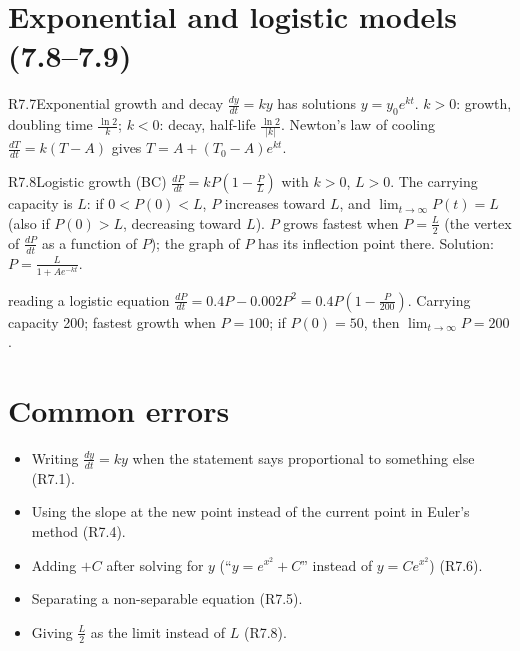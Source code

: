 \documentclass{apcalc}
\begin{document}
\section{Exponential and logistic models (7.8--7.9)}

\begin{rulebox}{R7.7}{Exponential growth and decay}
$\frac{dy}{dt}=ky$ has solutions $y=y_0e^{kt}$. $k>0$: growth, doubling time $\frac{\ln2}{k}$; $k<0$: decay, half-life $\frac{\ln2}{|k|}$. Newton's law of cooling $\frac{dT}{dt}=k(T-A)$ gives $T=A+(T_0-A)e^{kt}$.
\end{rulebox}

\begin{rulebox}{R7.8}{Logistic growth (BC)}
$\frac{dP}{dt}=kP\left(1-\frac PL\right)$ with $k>0$, $L>0$. The carrying capacity is $L$: if $0<P(0)<L$, $P$ increases toward $L$, and $\lim_{t\to\infty}P(t)=L$ (also if $P(0)>L$, decreasing toward $L$). $P$ grows fastest when $P=\frac L2$ (the vertex of $\frac{dP}{dt}$ as a function of $P$); the graph of $P$ has its inflection point there. Solution: $P=\frac{L}{1+Ae^{-kt}}$.
\end{rulebox}

\begin{example}{reading a logistic equation}
$\frac{dP}{dt}=0.4P-0.002P^2=0.4P\left(1-\frac{P}{200}\right)$. Carrying capacity 200; fastest growth when $P=100$; if $P(0)=50$, then $\lim_{t\to\infty}P=200$.
\end{example}

\section{Common errors}
\begin{itemize}
\item Writing $\frac{dy}{dt}=ky$ when the statement says proportional to something else (R7.1).
\item Using the slope at the new point instead of the current point in Euler's method (R7.4).
\item Adding $+C$ after solving for $y$ (``$y=e^{x^2}+C$'' instead of $y=Ce^{x^2}$) (R7.6).
\item Separating a non-separable equation (R7.5).
\item Giving $\frac L2$ as the limit instead of $L$ (R7.8).
\end{itemize}
\end{document}
